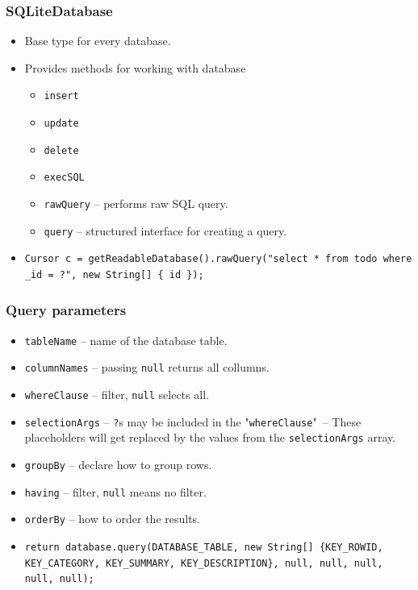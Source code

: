 \documentclass[10pt,xcolor=pdflatex]{beamer}
\begin{document}
\begin{frame}[fragile]\frametitle{SQLiteDatabase}
\begin{itemize}
	\item Base type for every database.
	\item Provides methods for working with database
      \begin{itemize}
    	\item \texttt{insert}
		\item \texttt{update}
		\item \texttt{delete}
		\item \texttt{execSQL}
		\item \texttt{rawQuery} -- performs raw SQL query.
		\item \texttt{query} -- structured interface for creating a query.
      \end{itemize}
    \item[]
      \lstset{language=Java, basicstyle=\footnotesize\ttfamily}
      \begin{lstlisting}
Cursor c = getReadableDatabase().rawQuery("select * from todo where _id = ?", new String[] { id });
      \end{lstlisting}
\end{itemize}
\end{frame}


\begin{frame}[fragile]\frametitle{Query parameters}
\begin{itemize}
	\item \texttt{tableName} -- name of the database table.
	\item \texttt{columnNames} -- passing \texttt{null} returns all collumns.
	\item \texttt{whereClause} -- filter, \texttt{null} selects all.
	\item \texttt{selectionArgs} -- \texttt{?}s may be included in the "\texttt{whereClause}"~-- These placeholders will get replaced by the values from the \texttt{selectionArgs} array.
	\item \texttt{groupBy} -- declare how to group rows.
	\item \texttt{having} -- filter, \texttt{null} means no filter.
	\item \texttt{orderBy} -- how to order the results.
	\item[]
      \lstset{language=Java, basicstyle=\footnotesize\ttfamily}
      \begin{lstlisting}
return database.query(DATABASE_TABLE, new String[] {KEY_ROWID, KEY_CATEGORY, KEY_SUMMARY, KEY_DESCRIPTION}, null, null, null, null, null);
      \end{lstlisting}
\end{itemize}
\end{frame}
\end{document}
